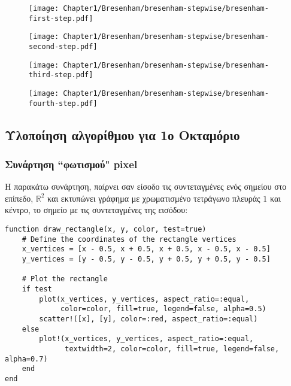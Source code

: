 \begin{figure}[h!]
\begin{center}
\begin{minipage}[b]{0.48\textwidth} %
    \texttt{[image: Chapter1/Bresenham/bresenham-stepwise/bresenham-first-step.pdf]}
\end{minipage}%
\hfill
\begin{minipage}[b]{0.48\textwidth} %
    \texttt{[image: Chapter1/Bresenham/bresenham-stepwise/bresenham-second-step.pdf]}
\end{minipage}

\vspace{1em} %

\noindent
\begin{minipage}[b]{0.48\textwidth} %
    \texttt{[image: Chapter1/Bresenham/bresenham-stepwise/bresenham-third-step.pdf]}
\end{minipage}%
\hfill
\begin{minipage}[b]{0.48\textwidth} %
    \texttt{[image: Chapter1/Bresenham/bresenham-stepwise/bresenham-fourth-step.pdf]}
\end{minipage}
\end{center}
\end{figure}

\subsection{Υλοποίηση αλγορίθμου για 1ο Οκταμόριο}

\subsubsection{Συνάρτηση ``φωτισμού" pixel}

Η παρακάτω συνάρτηση, παίρνει σαν είσοδο τις συντεταγμένες ενός σημείου στο επίπεδο, $\mathbb{R}^2$ και εκτυπώνει γράφημα με χρωματισμένο τετράγωνο πλευράς $1$ και κέντρο, το σημείο με τις συντεταγμένες της εισόδου:

\begin{lstlisting}[caption={Julia function to draw a rectangle}]
function draw_rectangle(x, y, color, test=true)
    # Define the coordinates of the rectangle vertices
    x_vertices = [x - 0.5, x + 0.5, x + 0.5, x - 0.5, x - 0.5]
    y_vertices = [y - 0.5, y - 0.5, y + 0.5, y + 0.5, y - 0.5]
    
    # Plot the rectangle
    if test    
        plot(x_vertices, y_vertices, aspect_ratio=:equal, 
             color=color, fill=true, legend=false, alpha=0.5)
        scatter!([x], [y], color=:red, aspect_ratio=:equal)
    else     
        plot!(x_vertices, y_vertices, aspect_ratio=:equal, 
              textwidth=2, color=color, fill=true, legend=false, alpha=0.7)
    end    
end
\end{lstlisting}

